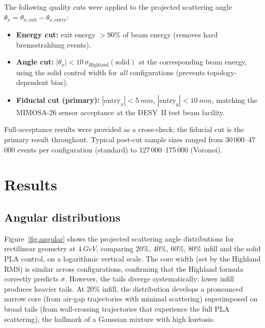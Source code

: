 \documentclass[final,5p,times,twocolumn]{elsarticle}
\begin{document}
The following quality cuts were applied to the projected scattering angle $\theta_x = \theta_{x,\mathrm{exit}} - \theta_{x,\mathrm{entry}}$:
\begin{itemize}
  \item \textbf{Energy cut:} exit energy $> 90\%$ of beam energy (removes hard bremsstrahlung events).
  \item \textbf{Angle cut:} $|\theta_x| < 10\,\sigma_{\mathrm{Highland}}(\text{solid})$ at the corresponding beam energy, using the solid control width for \emph{all} configurations (prevents topology-dependent bias).
  \item \textbf{Fiducial cut (primary):} $|\mathrm{entry}_x|<\SI{5}{mm}$, $|\mathrm{entry}_y|<\SI{10}{mm}$, matching the MIMOSA-26 sensor acceptance at the DESY~II test beam facility.
\end{itemize}
Full-acceptance results were provided as a cross-check; the fiducial cut is the primary result throughout.  Typical post-cut sample sizes ranged from 30\,000--47\,000 events per configuration (standard) to 127\,000--175\,000 (Voronoi).

\section{Results}
\label{sec:results}

\subsection{Angular distributions}
\label{sec:angular}

Figure~\ref{fig:angular} shows the projected scattering angle distributions for rectilinear geometry at $\SI{4}{GeV}$, comparing 20\%, 40\%, 60\%, 80\% infill and the solid PLA control, on a logarithmic vertical scale.  The core width (set by the Highland RMS) is similar across configurations, confirming that the Highland formula correctly predicts $\sigma$.  However, the tails diverge systematically: lower infill produces heavier tails.  At 20\% infill, the distribution develops a pronounced narrow core (from air-gap trajectories with minimal scattering) superimposed on broad tails (from wall-crossing trajectories that experience the full PLA scattering), the hallmark of a Gaussian mixture with high kurtosis.
\end{document}
